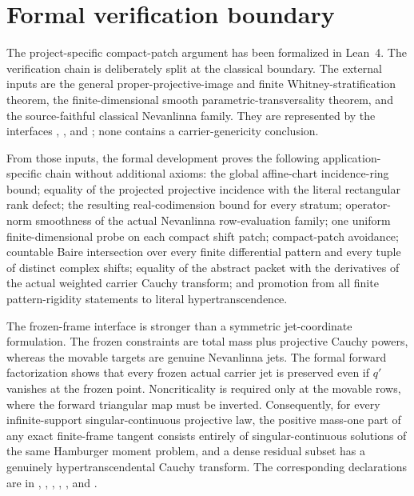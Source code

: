 \documentclass[11pt]{article}
\begin{document}
\section{Formal verification boundary}\label{sec:formal}

The project-specific compact-patch argument has been formalized in Lean~4.  The verification
chain is deliberately split at the classical boundary.  The external inputs are the general
proper-projective-image and finite Whitney-stratification theorem, the finite-dimensional smooth
parametric-transversality theorem, and the source-faithful classical Nevanlinna family.  They are
represented by the interfaces
,
, and
; none contains a carrier-genericity conclusion.

From those inputs, the formal development proves the following application-specific chain without
additional axioms: the global affine-chart incidence-ring bound; equality of the projected
projective incidence with the literal rectangular rank defect; the resulting real-codimension
bound for every stratum; operator-norm smoothness of the actual Nevanlinna row-evaluation family;
one uniform finite-dimensional probe on each compact shift patch; compact-patch avoidance;
countable Baire intersection over every finite differential pattern and every tuple of distinct
complex shifts; equality of the abstract packet with the derivatives of the actual weighted
carrier Cauchy transform; and promotion from all finite pattern-rigidity statements to literal
hypertranscendence.

The frozen-frame interface is stronger than a symmetric jet-coordinate formulation.  The frozen
constraints are total mass plus projective Cauchy powers, whereas the movable targets are genuine
Nevanlinna jets.  The formal forward factorization shows that every frozen actual carrier jet is
preserved even if $q'$ vanishes at the frozen point.  Noncriticality is required only at the
movable rows, where the forward triangular map must be inverted.  Consequently, for every
infinite-support singular-continuous projective law, the positive mass-one part of any exact
finite-frame tangent consists entirely of singular-continuous solutions of the same Hamburger
moment problem, and a dense residual subset has a genuinely hypertranscendental Cauchy transform.
The corresponding declarations are in
,
,
,
,
, and
.
\end{document}
